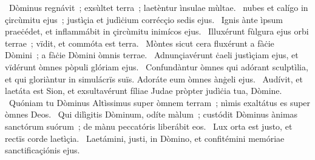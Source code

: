 ~Dòminus regnávit~; exsùltet terra~; laetèntur ìnsulae mùltae. 
~nubes et calígo in çircùmitu ejus~; justìçia et judìċium corrécçio sedis ejus. 
~Ignis ànte ìpsum praeċédet, et inflammábit in çircùmitu inimícos ejus. 
~Illuxérunt fùlgura ejus orbi terrae~; vïdit, et commóta est terra. 
~Mòntes sicut cera fluxérunt a fàċie Dòmini~; a fàċie Dòmini òmnis terrae. 
~Adnunçiavérunt ċaeli justìçiam ejus, et vïdérunt òmnes pòpuli glóriam ejus. 
~Confundàntur òmnes qui adórant sculptìlia, et qui gloriàntur in simulácrïs suïs. Adoráte eum òmnes ànġeli ejus. 
~Audívit, et laetáta est Sion, et exsultavérunt fíliae Judae pròpter judìċia tua, Dòmine. 
~Quóniam tu Dòminus Altìssimus super òmnem terram~; nìmis exaltátus es super òmnes Deos. 
~Qui dilìgitis Dòminum, odíte màlum~; custódit Dòminus ànimas sanctórum suórum~; de mànu peccatóris liberábit eos. 
~Lux orta est justo, et rectïs corde laetìçia. 
~Laetámini, justi, in Dòmino, et confitémini memóriae sanctificaçiónis ejus. 
